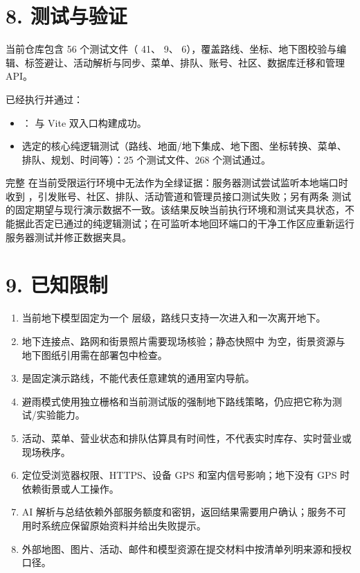 \documentclass[UTF8,a4paper,12pt]{ctexart}
\begin{document}
\section{8. 测试与验证}
当前仓库包含 56 个测试文件（\texttt{} 41、\texttt{} 9、\texttt{} 6），覆盖路线、坐标、地下图校验与编辑、标签避让、活动解析与同步、菜单、排队、账号、社区、数据库迁移和管理 API。\par
已经执行并通过：\par
\begin{itemize}
\item \texttt{}：\texttt{} 与 Vite 双入口构建成功。
\item 选定的核心纯逻辑测试（路线、地面/地下集成、地下图、坐标转换、菜单、排队、规划、时间等）：25 个测试文件、268 个测试通过。
\end{itemize}
完整 \texttt{} 在当前受限运行环境中无法作为全绿证据：服务器测试尝试监听本地端口时收到 \texttt{}，引发账号、社区、排队、活动管道和管理员接口测试失败；另有两条 \texttt{} 测试的固定期望与现行演示数据不一致。该结果反映当前执行环境和测试夹具状态，不能据此否定已通过的纯逻辑测试；在可监听本地回环端口的干净工作区应重新运行服务器测试并修正数据夹具。\par
\section{9. 已知限制}
\begin{enumerate}
\item 当前地下模型固定为一个 \texttt{} 层级，路线只支持一次进入和一次离开地下。
\item 地下连接点、路网和街景照片需要现场核验；静态快照中 \texttt{} 为空，街景资源与地下图纸引用需在部署包中检查。
\item \texttt{} 是固定演示路线，不能代表任意建筑的通用室内导航。
\item 避雨模式使用独立栅格和当前测试版的强制地下路线策略，仍应把它称为测试/实验能力。
\item 活动、菜单、营业状态和排队估算具有时间性，不代表实时库存、实时营业或现场秩序。
\item 定位受浏览器权限、HTTPS、设备 GPS 和室内信号影响；地下没有 GPS 时依赖街景或人工操作。
\item AI 解析与总结依赖外部服务额度和密钥，返回结果需要用户确认；服务不可用时系统应保留原始资料并给出失败提示。
\item 外部地图、图片、活动、邮件和模型资源在提交材料中按清单列明来源和授权口径。
\end{enumerate}
\end{document}
